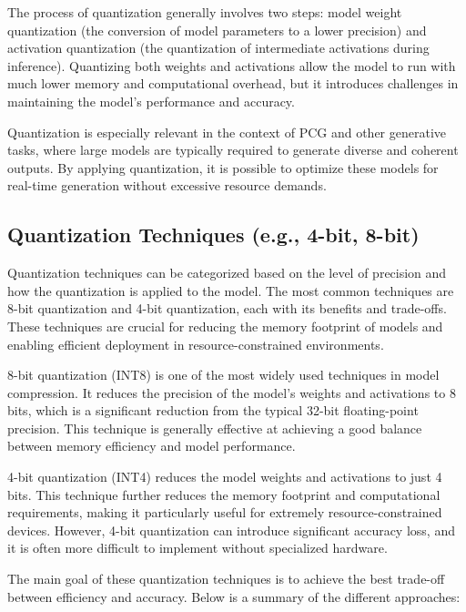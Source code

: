 The process of quantization generally involves two steps: model weight quantization
(the conversion of model parameters to a lower precision) and activation quantization (the
quantization of intermediate activations during inference). Quantizing both weights and
activations allow the model to run with much lower memory and computational overhead,
but it introduces challenges in maintaining the model's performance and accuracy.

Quantization is especially relevant in the context of PCG and other generative tasks,
where large models are typically required to generate diverse and coherent outputs. By
applying quantization, it is possible to optimize these models for real-time generation
without excessive resource demands.

\subsection{Quantization Techniques (e.g., 4-bit, 8-bit)}

Quantization techniques can be categorized based on the level of precision and how the
quantization is applied to the model. The most common techniques are 8-bit quantization
and 4-bit quantization, each with its benefits and trade-offs. These techniques are crucial
for reducing the memory footprint of models and enabling efficient deployment in resource-constrained
environments.

8-bit quantization (INT8) is one of the most widely used techniques in model compression.
It reduces the precision of the model's weights and activations to 8 bits, which
is a significant reduction from the typical 32-bit floating-point precision. This technique
is generally effective at achieving a good balance between memory efficiency and model
performance.

4-bit quantization (INT4) reduces the model weights and activations to just 4 bits.
This technique further reduces the memory footprint and computational requirements,
making it particularly useful for extremely resource-constrained devices. However, 4-bit
quantization can introduce significant accuracy loss, and it is often more difficult to
implement without specialized hardware.

The main goal of these quantization techniques is to achieve the best trade-off between
efficiency and accuracy. Below is a summary of the different approaches:

